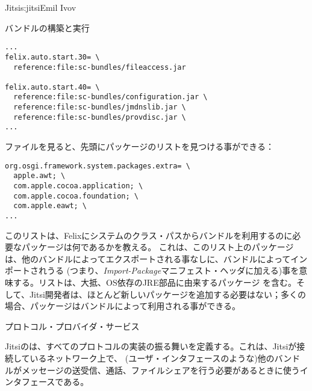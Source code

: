 \begin{aosachapter}{Jitsi}{s:jitsi}{Emil Ivov}
\begin{aosasect1}{バンドルの構築と実行}
\begin{verbatim}
...
felix.auto.start.30= \
  reference:file:sc-bundles/fileaccess.jar

felix.auto.start.40= \
  reference:file:sc-bundles/configuration.jar \
  reference:file:sc-bundles/jmdnslib.jar \
  reference:file:sc-bundles/provdisc.jar \
...
\end{verbatim}

\code{felix.client.run.properties}ファイルを見ると、先頭にパッケージのリストを見つける事ができる：

\begin{verbatim}
org.osgi.framework.system.packages.extra= \
  apple.awt; \
  com.apple.cocoa.application; \
  com.apple.cocoa.foundation; \
  com.apple.eawt; \
...
\end{verbatim}

\noindent このリストは、Felixにシステムのクラス・パスからバンドルを利用するのに必要なパッケージは何であるかを教える。
これは、このリスト上のパッケージは、他のバンドルによってエクスポートされる事なしに、バンドルによってインポートされうる
(つまり、\emph{Import-Package}マニフェスト・ヘッダに加える)事を意味する。リストは、大抵、OS依存のJRE部品に由来するパッケージ
を含む。そして、Jitsi開発者は、ほとんど新しいパッケージを追加する必要はない；多くの場合、パッケージはバンドルによって利用される事ができる。

\end{aosasect1}

\begin{aosasect1}{プロトコル・プロバイダ・サービス}

Jitsiの\code{ProtocolProviderService}は、すべてのプロトコルの実装の振る舞いを定義する。これは、Jitsiが接続しているネットワーク上で、
(ユーザ・インタフェースのような)他のバンドルがメッセージの送受信、通話、ファイルシェアを行う必要があるときに使うインタフェースである。


\end{aosasect1}
\end{aosachapter}
